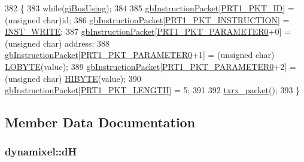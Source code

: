 \begin{DoxyCode}
382 \{
383     \textcolor{keywordflow}{while}(\hyperlink{classdynamixel_ad10e0e49f5fef04bf789a89c14cc470a}{giBusUsing});
384 
385     \hyperlink{classdynamixel_afd94dcf01b8e96298727776e222de722}{gbInstructionPacket}[\hyperlink{dynamixel_8h_a3c2bb339c587abadd977eb2f14daeff9}{PRT1\_PKT\_ID}] = (\textcolor{keywordtype}{unsigned} char)\textcolor{keywordtype}{id};
386     \hyperlink{classdynamixel_afd94dcf01b8e96298727776e222de722}{gbInstructionPacket}[\hyperlink{dynamixel_8h_a3da1d083c018994fb0c859f4e06e1f78}{PRT1\_PKT\_INSTRUCTION}] = 
      \hyperlink{dynamixel_8h_a1c304d06170982719fd605a87c9101f0}{INST\_WRITE};
387     \hyperlink{classdynamixel_afd94dcf01b8e96298727776e222de722}{gbInstructionPacket}[\hyperlink{dynamixel_8h_a939ef836d0605d2f4f9372df3ea0855f}{PRT1\_PKT\_PARAMETER0}+0] = (\textcolor{keywordtype}{unsigned} char)
      address;
388     \hyperlink{classdynamixel_afd94dcf01b8e96298727776e222de722}{gbInstructionPacket}[\hyperlink{dynamixel_8h_a939ef836d0605d2f4f9372df3ea0855f}{PRT1\_PKT\_PARAMETER0}+1] = (\textcolor{keywordtype}{unsigned} char)
      \hyperlink{dynamixel_8h_a04c0416272e5c07bdf955d803a21688e}{LOBYTE}(value);
389     \hyperlink{classdynamixel_afd94dcf01b8e96298727776e222de722}{gbInstructionPacket}[\hyperlink{dynamixel_8h_a939ef836d0605d2f4f9372df3ea0855f}{PRT1\_PKT\_PARAMETER0}+2] = (\textcolor{keywordtype}{unsigned} char)
      \hyperlink{dynamixel_8h_a75c5b5f21e837e80c0feb4da9a421f87}{HIBYTE}(value);
390     \hyperlink{classdynamixel_afd94dcf01b8e96298727776e222de722}{gbInstructionPacket}[\hyperlink{dynamixel_8h_ab24601f91d0364e4b62edad3c2a0a5c4}{PRT1\_PKT\_LENGTH}] = 5;
391     
392     \hyperlink{classdynamixel_aebfc569c6b1eb0b98f8c385f0f921fc0}{txrx\_packet}();
393 \}
\end{DoxyCode}


\subsection{Member Data Documentation}
\hypertarget{classdynamixel_ae003cc90ada6d7b70eaa4ea9d42d4deb}{}
\subsubsection[{d\+H}]{ dynamixel\+::d\+H\hspace{0.3cm}{\ttfamily [private]}}\label{classdynamixel_ae003cc90ada6d7b70eaa4ea9d42d4deb}
\hypertarget{classdynamixel_a5b603f6bed7ccc595f1f50bd6a6ebbfc}{}
